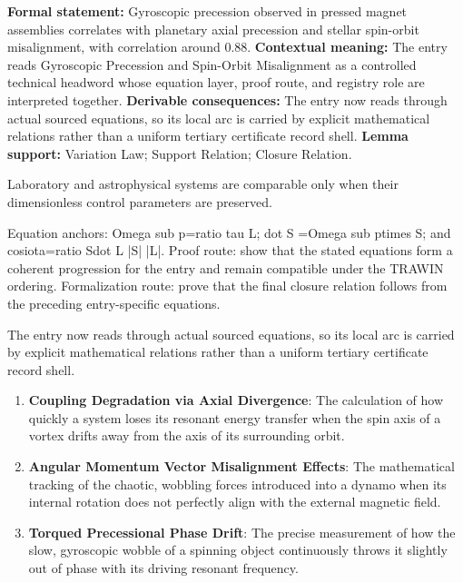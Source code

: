 \begingroup\footnotesize\setlength{\emergencystretch}{3em}\sloppy
\textbf{Formal statement:} Gyroscopic precession observed in pressed magnet assemblies correlates with planetary axial precession and stellar spin-orbit misalignment, with correlation around 0.88. \textbf{Contextual meaning:} The entry reads Gyroscopic Precession and Spin-Orbit Misalignment as a controlled technical headword whose equation layer, proof route, and registry role are interpreted together. \textbf{Derivable consequences:} The entry now reads through actual sourced equations, so its local arc is carried by explicit mathematical relations rather than a uniform tertiary certificate record shell. \textbf{Lemma support:} Variation Law; Support Relation; Closure Relation.\par
\endgroup

Laboratory and astrophysical systems are comparable only when their dimensionless control parameters are preserved.

Equation anchors: Omega sub p=ratio tau L; dot S =Omega sub ptimes S; and cosiota=ratio Sdot L |S| |L|. Proof route: show that the stated equations form a coherent progression for the entry and remain compatible under the TRAWIN ordering. Formalization route: prove that the final closure relation follows from the preceding entry-specific equations.

The entry now reads through actual sourced equations, so its local arc is carried by explicit mathematical relations rather than a uniform tertiary certificate record shell.
\endgroup

\begin{enumerate}[leftmargin=1.6em,itemsep=6pt,topsep=4pt]
\item \textbf{Coupling Degradation via Axial Divergence}: The calculation of how quickly a system loses its resonant energy transfer when the spin axis of a vortex drifts away from the axis of its surrounding orbit.
\item \textbf{Angular Momentum Vector Misalignment Effects}: The mathematical tracking of the chaotic, wobbling forces introduced into a dynamo when its internal rotation does not perfectly align with the external magnetic field.
\item \textbf{Torqued Precessional Phase Drift}: The precise measurement of how the slow, gyroscopic wobble of a spinning object continuously throws it slightly out of phase with its driving resonant frequency.
\end{enumerate}

